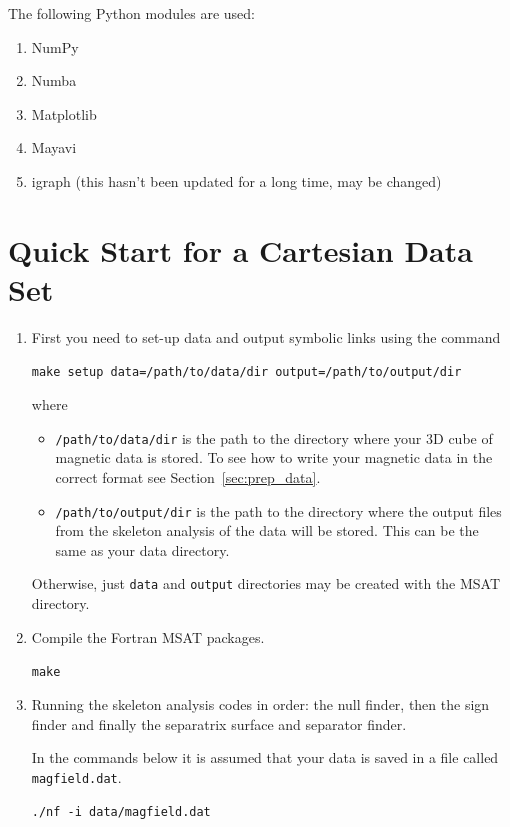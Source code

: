 \documentclass[12pt]{article}
\begin{document}
    The following Python modules are used:
    \begin{enumerate}
      \item NumPy
      \item Numba
      \item Matplotlib
      \item Mayavi
      \item igraph (this hasn't been updated for a long time, may be changed)
    \end{enumerate}

  \section{Quick Start for a Cartesian Data Set}

    \begin{enumerate}
      \item First you need to set-up data and output symbolic links using the command

      \texttt{make setup data=/path/to/data/dir output=/path/to/output/dir}

      where
      \begin{itemize}
        \item \texttt{/path/to/data/dir} is the path to the directory where your 3D cube of magnetic data is stored. To see how to write your magnetic data in the correct format see Section~\ref{sec:prep_data}.

        \item \texttt{/path/to/output/dir} is the path to the directory where the output files from the skeleton analysis of the data will be stored. This can be the same as your data directory.
      \end{itemize}

      Otherwise, just \texttt{data} and \texttt{output} directories may be created with the MSAT directory.

      \item Compile the Fortran MSAT packages.

      \texttt{make}

      \item Running the skeleton analysis codes in order: the null finder, then the sign finder and finally the separatrix surface and separator finder.

      In the commands below it is assumed that your data is saved in a file called \texttt{magfield.dat}.

      \texttt{./nf -i data/magfield.dat}


\end{enumerate}
\end{document}
